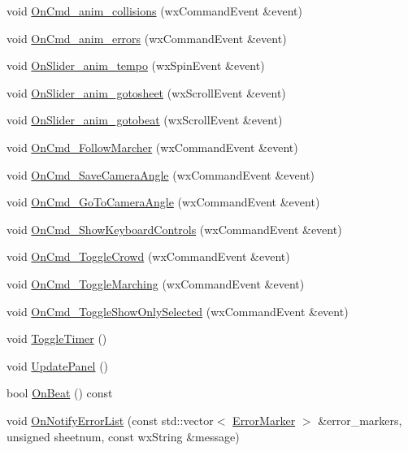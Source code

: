 \begin{DoxyCompactItemize}
\item 
void \hyperlink{a00012_a66522efb1ba929091b007847d5731062}{On\-Cmd\-\_\-anim\-\_\-collisions} (wx\-Command\-Event \&event)
\item 
void \hyperlink{a00012_a6b92abad4cb4de31486819b52324a220}{On\-Cmd\-\_\-anim\-\_\-errors} (wx\-Command\-Event \&event)
\item 
void \hyperlink{a00012_a5ba62cdbffd7d38267afd247b392177e}{On\-Slider\-\_\-anim\-\_\-tempo} (wx\-Spin\-Event \&event)
\item 
void \hyperlink{a00012_a00bcedee9639a6cdfe6d5b155decce7e}{On\-Slider\-\_\-anim\-\_\-gotosheet} (wx\-Scroll\-Event \&event)
\item 
void \hyperlink{a00012_ae856b335a3ae8d693009289dfb81ab2f}{On\-Slider\-\_\-anim\-\_\-gotobeat} (wx\-Scroll\-Event \&event)
\item 
void \hyperlink{a00012_a1371542268ed553069f757400326c6f6}{On\-Cmd\-\_\-\-Follow\-Marcher} (wx\-Command\-Event \&event)
\item 
void \hyperlink{a00012_a535bf369a05e55e151dbf35d4c8730b6}{On\-Cmd\-\_\-\-Save\-Camera\-Angle} (wx\-Command\-Event \&event)
\item 
void \hyperlink{a00012_a491228762f2739e53ee796551aa05e73}{On\-Cmd\-\_\-\-Go\-To\-Camera\-Angle} (wx\-Command\-Event \&event)
\item 
void \hyperlink{a00012_ac559d77663e583937a44506f1c06aa75}{On\-Cmd\-\_\-\-Show\-Keyboard\-Controls} (wx\-Command\-Event \&event)
\item 
void \hyperlink{a00012_afe675f7081ca6a4352c5bcd2444e1fc3}{On\-Cmd\-\_\-\-Toggle\-Crowd} (wx\-Command\-Event \&event)
\item 
void \hyperlink{a00012_ab65c1e97af52af268606a76178cf64f5}{On\-Cmd\-\_\-\-Toggle\-Marching} (wx\-Command\-Event \&event)
\item 
void \hyperlink{a00012_aa1b1cfd58585f393ed022e2bcb4be71a}{On\-Cmd\-\_\-\-Toggle\-Show\-Only\-Selected} (wx\-Command\-Event \&event)
\item 
void \hyperlink{a00012_aa2be2a08b4ec5421f58a62447d55a788}{Toggle\-Timer} ()
\item 
void \hyperlink{a00012_aededa63d75a6afab9c85a1ba64d95ccb}{Update\-Panel} ()
\item 
bool \hyperlink{a00012_abb86dfea245b11389b7f28b054e786fb}{On\-Beat} () const 
\item 
void \hyperlink{a00012_a544275588f75eb702749983997b8843d}{On\-Notify\-Error\-List} (const std\-::vector$<$ \hyperlink{a00098}{Error\-Marker} $>$ \&error\-\_\-markers, unsigned sheetnum, const wx\-String \&message)

\end{DoxyCompactItemize}
